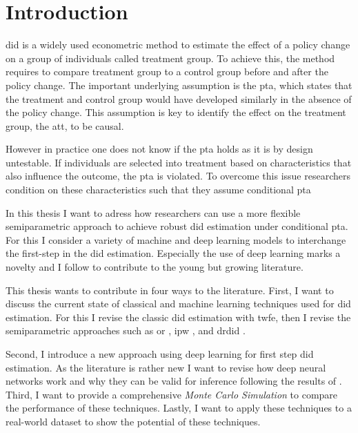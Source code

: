 \section{Introduction}




\ac{did} is a widely used econometric method to estimate the effect of a policy change on a group of individuals called treatment group.
To achieve this, the method requires to compare treatment group to a control group before and after the policy change.
The important underlying assumption is the \ac{pta}, which states that the treatment and control group would have developed similarly in the absence of the policy change.
This assumption is key to identify the effect on the treatment group, the \ac{att}, to be causal.

However in practice one does not know if the \ac{pta} holds as it is by design untestable.
If individuals are selected into treatment based on characteristics that also influence the outcome, the \ac{pta} is violated.
To overcome this issue researchers condition on these characteristics such that they assume conditional \ac{pta} \citep[see][]{santannaDoublyRobustDifferenceindifferences2020,manfeDifferenceInDifferenceDesignRepeated}

In this thesis I want to adress how researchers can use a more flexible semiparametric approach to achieve robust \ac{did} estimation under conditional \ac{pta}.
For this I consider a variety of machine and deep learning models to interchange the first-step in the \ac{did} estimation.
Especially the use of deep learning marks a novelty and I follow \citet{farrellDeepNeuralNetworks2021} to contribute to the young but growing literature.



%
This thesis wants to contribute in four ways to the literature.
First, I want to discuss the current state of classical and machine learning techniques used for \ac{did} estimation.
For this I revise the classic \ac{did} estimation with \ac{twfe}, then I revise the semiparametric approaches such as \ac{or} \citep[see][]{heckmanMatchingEconometricEvaluation1998}, \ac{ipw} \citep[see][]{abadieSemiparametricDifferenceinDifferencesEstimators2005}, and \ac{drdid} \citep[see][]{santannaDoublyRobustDifferenceindifferences2020}.

Second, I introduce a new approach using deep learning for first step \ac{did} estimation.
As the literature is rather new I want to revise how deep neural networks work and why they can be valid for inference following the results of \citet{farrellDeepNeuralNetworks2021}.
Third, I want to provide a comprehensive \textit{Monte Carlo Simulation} to compare the performance of these techniques. %
Lastly, I want to apply these techniques to a real-world dataset to show the potential of these techniques. %


